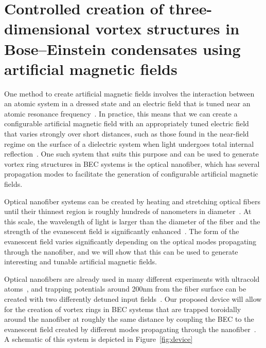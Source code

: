 \section{Controlled creation of three-dimensional vortex structures in Bose--Einstein condensates using artificial magnetic fields}

One method to create artificial magnetic fields involves the interaction between an atomic system in a dressed state and an electric field that is tuned near an atomic resonance frequency~\cite{dalibard2011}.
In practice, this means that we can create a configurable artificial magnetic field with an appropriately tuned electric field that varies strongly over short distances, such as those found in the near-field regime on the surface of a dielectric system when light undergoes total internal reflection~\cite{mochol2015}.
One such system that suits this purpose and can be used to generate vortex ring structures in BEC systems is the optical nanofiber, which has several propagation modes to facilitate the generation of configurable artificial magnetic fields.

Optical nanofiber systems can be created by heating and stretching optical fibers until their thinnest region is roughly hundreds of nanometers in diameter~\cite{ward2006, tong2003}.
At this scale, the wavelength of light is larger than the diameter of the fiber and the strength of the evanescent field is significantly enhanced~\cite{yariv1997}.
The form of the evanescent field varies significantly depending on the optical modes propagating through the nanofiber, and we will show that this can be used to generate interesting and tunable artificial magnetic fields.

Optical nanofibers are already used in many different experiments with ultracold atoms~\cite{vetsch2010, lacroute2012, nieddu2016, sague2007, russell2011, kumar2015}, and trapping potentials around 200nm from the fiber surface can be created with two differently detuned input fields~\cite{kien2004, phelan2013}.
Our proposed device will allow for the creation of vortex rings in BEC systems that are trapped toroidally around the nanofiber at roughly the same distance by coupling the BEC to the evanescent field created by different modes propagating through the nanofiber~\cite{sachdeva2017}.
A schematic of this system is depicted in Figure~\ref{fig:device}

